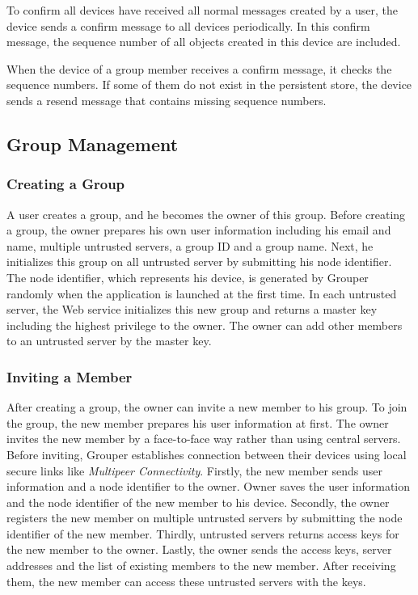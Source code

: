 \documentclass[twocolumn,10pt]{article}
\begin{document}
To confirm all devices have received all normal messages created by a user, the device sends a confirm message to all devices periodically. 
In this confirm message, the sequence number of all objects created in this device are included.

When the device of a group member receives a confirm message, it checks the sequence numbers. 
If some of them do not exist in the persistent store, the device sends a resend message that contains missing sequence numbers.

\subsection{Group Management}

\subsubsection{Creating a Group}

A user creates a group, and he becomes the owner of this group.  
Before creating a group, the owner prepares his own user information including his email and name, multiple untrusted servers, a group ID and a group name. 
Next, he initializes this group on all untrusted server by submitting his node identifier. 
The node identifier, which represents his device, is generated by Grouper randomly when the application is launched at the first time. 
In each untrusted server, the Web service initializes this new group and returns a master key including the highest privilege to the owner. 
The owner can add other members to an untrusted server by the master key.

\subsubsection{Inviting a Member}

After creating a group, the owner can invite a new member to his group. 
To join the group, the new member prepares his user information at first. 
The owner invites the new member by a face-to-face way rather than using central servers. 
Before inviting, Grouper establishes connection between their devices using local secure links like \emph{Multipeer Connectivity}\cite{mc}. 
Firstly, the new member sends user information and a node identifier to the owner. 
Owner saves the user information and the node identifier of the new member to his device. 
Secondly, the owner registers the new member on multiple untrusted servers by submitting the node identifier of the new member. 
Thirdly, untrusted servers returns access keys for the new member to the owner. 
Lastly, the owner sends the access keys, server addresses and the list of existing members to the new member. 
After receiving them, the new member can access these untrusted servers with the keys.
\end{document}
